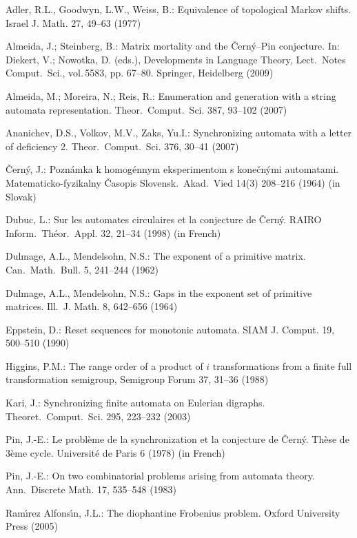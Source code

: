 \documentclass[11pt]{article}
\begin{document}
\begin{thebibliography}{99}
Adler, R.L., Goodwyn, L.W., Weiss, B.: Equivalence of topological Markov shifts.
Israel J. Math. 27, 49--63 (1977)

Almeida, J.; Steinberg, B.: Matrix mortality and the \v{C}ern\'{y}--Pin
conjecture. In:  Diekert, V.; Nowotka, D. (eds.), Developments in
Language Theory, Lect.\ Notes Comput.\ Sci., vol.\,5583, pp. 67--80.
Springer, Heidelberg (2009)

Almeida, M.; Moreira, N.; Reis, R.: Enumeration and generation with a string
automata representation. Theor.\ Comput.\ Sci. 387, 93--102 (2007)

Ananichev, D.S., Volkov, M.V., Zaks, Yu.I.: Synchronizing automata
with a letter of deficiency 2. Theor.\ Comput.\ Sci. 376, 30--41 (2007)

\v{C}ern\'{y}, J.: Pozn\'{a}mka k homog\'{e}nnym eksperimentom s
kone\v{c}n\'{y}mi automatami. Matematicko-fyzikalny \v{C}asopis
Slovensk.\ Akad.\ Vied 14(3) 208--216 (1964) (in Slovak)

Dubuc, L.: Sur les automates circulaires et la conjecture de
\v{C}ern\'y. RAIRO Inform.\ Th\'eor.\ Appl. 32, 21--34 (1998) (in
French)

Dulmage, A.L., Mendelsohn, N.S.: The exponent of a primitive matrix.
Can.\ Math.\ Bull. 5, 241--244 (1962)

Dulmage, A.L., Mendelsohn, N.S.: Gaps in the exponent set of primitive
matrices. Ill.\ J. Math. 8, 642--656 (1964)

Eppstein, D.: Reset sequences for monotonic automata. SIAM J.
Comput. 19, 500--510 (1990)

Higgins, P.M.: The range order of a product of $i$ transformations
from a finite full transformation semigroup, Semigroup Forum 37, 31--36
(1988)

Kari, J.: Synchronizing finite automata on Eulerian digraphs.
Theoret.\ Comput.\ Sci. 295, 223--232 (2003)

Pin, J.-E.: Le probl\`eme de la synchronization et la conjecture de
\v{C}ern\'y. Th\`ese de 3\`eme cycle. Universit\'e de Paris 6 (1978) (in
French)

Pin, J.-E.: On two combinatorial problems arising from automata
theory. Ann.\ Discrete Math. 17, 535--548 (1983)

Ram\'{\i}rez Alfons\'{\i}n, J.L.: The diophantine Frobenius problem.
Oxford University Press (2005)


\end{thebibliography}
\end{document}
